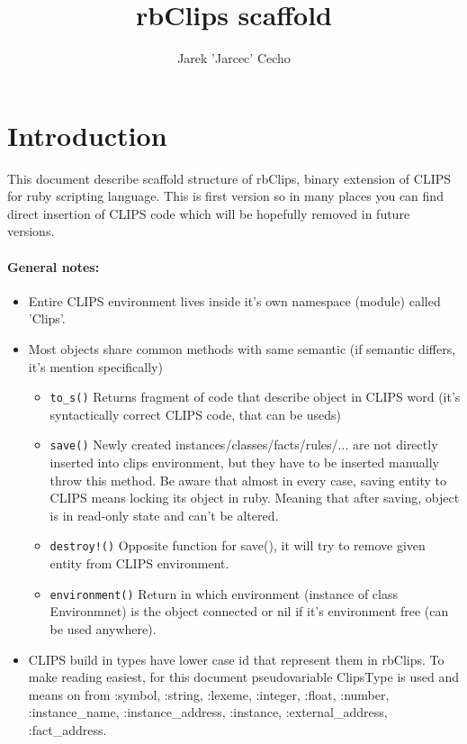 \documentclass[a4paper,10pt]{article}
\title{rbClips scaffold}
\author{Jarek 'Jarcec' Cecho}
\begin{document}
\maketitle
\tableofcontents

\section{Introduction}
This document describe scaffold structure of rbClips, binary extension of CLIPS for ruby scripting language. This is first version so in many places you can find direct insertion of CLIPS code which will be hopefully removed in future versions.

\paragraph{General notes:}
\begin{itemize}
 \item Entire CLIPS environment lives inside it's own namespace (module) called 'Clips'.
 \item Most objects share common methods with same semantic (if semantic differs, it's mention specifically)
	\begin{itemize}
	 \item \texttt{to\_s()} Returns fragment of code that describe object in CLIPS word (it's syntactically correct CLIPS code, that can be useds)
	 \item \texttt{save()} Newly created instances/classes/facts/rules/... are not directly inserted into clips environment, but they have to be inserted manually throw this method. Be aware that almost in every case, saving entity to CLIPS means locking its object in ruby. Meaning that after saving, object is in read-only state and can't be altered.
	 \item \texttt{destroy!()} Opposite function for save(), it will try to remove given entity from CLIPS environment.
	 \item \texttt{environment()} Return in which environment (instance of class Environmnet) is the object connected or nil if it's environment free (can be used anywhere).
	\end{itemize}
 \item CLIPS build in types have lower case id that represent them in rbClips. To make reading easiest, for this document pseudovariable ClipsType is used and means on from :symbol, :string, :lexeme, :integer, :float, :number, :instance\_name, :instance\_address, :instance, :external\_address, :fact\_address.
\end{itemize}
\end{document}
